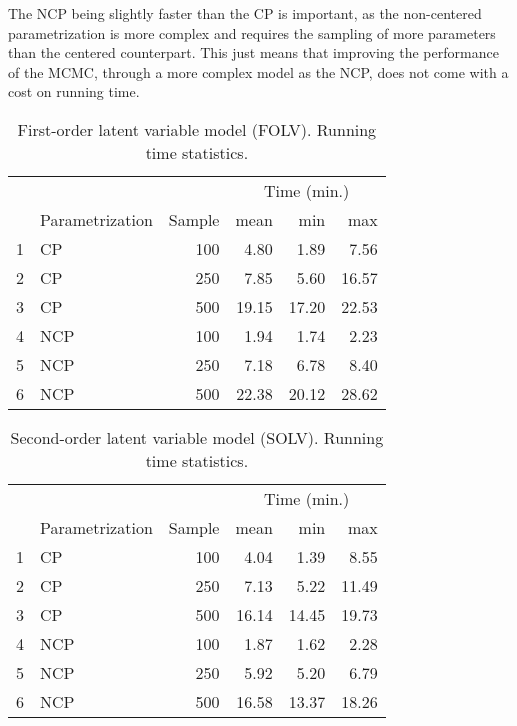 The NCP being slightly faster than the CP is important, as the non-centered parametrization is more complex and requires the sampling of more parameters than the centered counterpart. This just means that improving the performance of the MCMC, through a more complex model as the NCP, does not come with a cost on running time.
%
\begin{table}[H]
	\centering
	\begin{tabular}{rlrrrr}
		\hline
		\multicolumn{3}{c}{ }& \multicolumn{3}{c}{ Time (min.) } \\ 
		\cmidrule(rl){4-6} 
		& Parametrization & Sample & mean & min & max \\ 
		\hline\hline
		1 & CP & 100 & 4.80 & 1.89 & 7.56 \\ 
		2 & CP & 250 & 7.85 & 5.60 & 16.57 \\ 
		3 & CP & 500 & 19.15 & 17.20 & 22.53 \\ 
		\hline
		4 & NCP & 100 & 1.94 & 1.74 & 2.23 \\ 
		5 & NCP & 250 & 7.18 & 6.78 & 8.40 \\ 
		6 & NCP & 500 & 22.38 & 20.12 & 28.62 \\
		\hline
	\end{tabular}
	\caption[First-order latent variable model (FOLV). Running time statistics.]%
	{First-order latent variable model (FOLV). Running time statistics.} 
	\label{tab:FOLV_time}
\end{table}
%
\begin{table}[H]
	\centering
	\begin{tabular}{rlrrrr}
		\hline
		\multicolumn{3}{c}{ }& \multicolumn{3}{c}{ Time (min.) } \\ 
		\cmidrule(rl){4-6} 
		& Parametrization & Sample & mean & min & max \\ 
		\hline\hline
		1 & CP & 100 & 4.04 & 1.39 & 8.55 \\ 
		2 & CP & 250 & 7.13 & 5.22 & 11.49 \\ 
		3 & CP & 500 & 16.14 & 14.45 & 19.73 \\ 
		\hline
		4 & NCP & 100 & 1.87 & 1.62 & 2.28 \\ 
		5 & NCP & 250 & 5.92 & 5.20 & 6.79 \\ 
		6 & NCP & 500 & 16.58 & 13.37 & 18.26 \\
		\hline
	\end{tabular}
	\caption[Second-order latent variable model (SOLV). Running time statistics.]%
	{Second-order latent variable model (SOLV). Running time statistics.} 
	\label{tab:SOLV_time}
\end{table}
